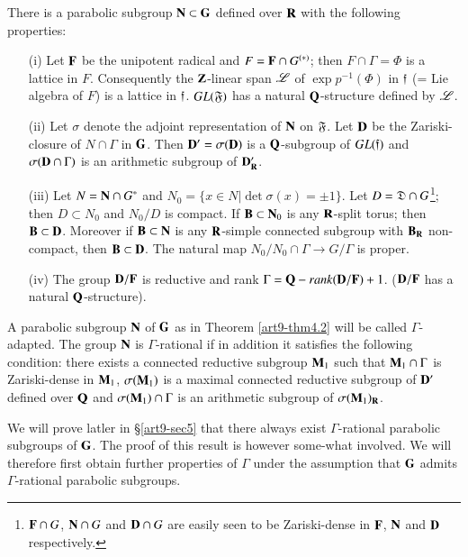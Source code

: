 \begin{theorem}\label{art9-thm4.2}
There is a parabolic subgroup $\mathbf{N} \subset \mathbf{G}$ defined over $\mathbf{R}$ with the following properties:
\begin{itemize}
\item[(i)] Let $\mathbf{F}$ be the unipotent radical and $F = \mathbf{F} \cap G^{(\ast)}$; then $F \cap \Gamma = \Phi$ is a lattice in $F$. Consequently the $\mathbf{Z}$-linear span $\mathscr{L}$ of $\exp p^{-1}(\Phi)$ in $\mathfrak{f}$ (= Lie algebra of $F$) is a lattice in $\mathfrak{f}$. $GL (\mathfrak{F})$ has a natural $\mathbf{Q}$-structure defined by $\mathscr{L}$.

\item[(ii)] Let $\sigma$ denote the adjoint representation of $\mathbf{N}$ on $\mathfrak{F}$. Let $\mathbf{D}$ be the Zariski-closure of $N \cap \Gamma$ in $\mathbf{G}$. Then $\mathbf{D}' = \sigma (\mathbf{D})$ is a $\mathbf{Q}$-subgroup of $GL(\mathfrak{f})$ and $\sigma (\mathbf{D} \cap \Gamma)$ is an arithmetic subgroup of $\mathbf{D}'_{\mathbf{R}}$.

\item[(iii)] Let $N = \mathbf{N} \cap G^\ast$ and $N_0 =\{x \in N \big| \det \sigma (x) = \pm 1\}$. Let $D = \mathfrak{D} \cap G$\footnote{$\mathbf{F} \cap G$, $\mathbf{N} \cap G$ and $\mathbf{D} \cap G$ are easily seen to be Zariski-dense in $\mathbf{F}$, $\mathbf{N}$ and $\mathbf{D}$ respectively.}; then $D \subset N_0$ and $N_0 / D$ is compact. If $\mathbf{B} \subset \mathbf{N}_0$ is any $\mathbf{R}$-split torus; then $\mathbf{B} \subset \mathbf{D}$. Moreover if $\mathbf{B} \subset \mathbf{N}$ is any $\mathbf{R}$-simple connected subgroup with $\mathbf{B}_{\mathbf{R}}$ non-compact, then $\mathbf{B} \subset \mathbf{D}$. The natural map $N_0/N_0 \cap \Gamma \to G /\Gamma$ is proper.

\item[(iv)] The group $\mathbf{D}/\mathbf{F}$ is reductive and rank $\Gamma = \mathbf{Q}-rank (\mathbf{D}/ \mathbf{F}) + 1$. ($\mathbf{D}/\mathbf{F}$ has a natural $\mathbf{Q}$-structure).
\end{itemize}
\end{theorem}

\begin{definition}\label{art9-def4.3}
A parabolic subgroup $\mathbf{N}$ of $\mathbf{G}$ as in Theorem \ref{art9-thm4.2} will be called $\Gamma$-adapted. The group $\mathbf{N}$ is $\Gamma$-rational if in addition it satisfies the following condition: there exists a connected reductive subgroup $\mathbf{M}_1$ such that $\mathbf{M}_1 \cap \Gamma$ is Zariski-dense in $\mathbf{M}_1$, $\sigma (\mathbf{M}_1)$ is a maximal connected reductive subgroup of $\mathbf{D}'$ defined over $\mathbf{Q}$ and $\sigma (\mathbf{M}_1) \cap \Gamma$ is an arithmetic subgroup of $\sigma (\mathbf{M}_1)_{\mathbf{R}}$. 
\end{definition}

We will prove latler in \S \ref{art9-sec5} that there always exist $\Gamma$-rational parabolic subgroups of $\mathbf{G}$. The proof of this result is however some-what involved. We will therefore first obtain further properties of $\Gamma$ under the assumption that $\mathbf{G}$ admits $\Gamma$-rational parabolic subgroups.
  
